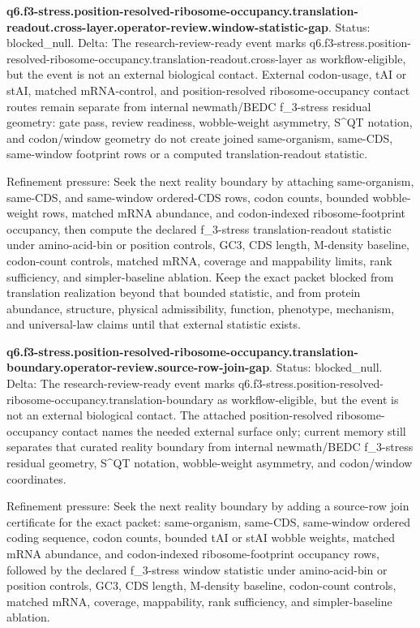 \textbf{q6.f3-stress.position-resolved-ribosome-occupancy.translation-readout.cross-layer.operator-review.window-statistic-gap}. Status: blocked\_null. Delta: The research-review-ready event marks q6.f3-stress.position-resolved-ribosome-occupancy.translation-readout.cross-layer as workflow-eligible, but the event is not an external biological contact. External codon-usage, tAI or stAI, matched mRNA-control, and position-resolved ribosome-occupancy contact routes remain separate from internal newmath/BEDC f\_3-stress residual geometry: gate pass, review readiness, wobble-weight asymmetry, S\textasciicircum{}QT notation, and codon/window geometry do not create joined same-organism, same-CDS, same-window footprint rows or a computed translation-readout statistic.

Refinement pressure: Seek the next reality boundary by attaching same-organism, same-CDS, and same-window ordered-CDS rows, codon counts, bounded wobble-weight rows, matched mRNA abundance, and codon-indexed ribosome-footprint occupancy, then compute the declared f\_3-stress translation-readout statistic under amino-acid-bin or position controls, GC3, CDS length, M-density baseline, codon-count controls, matched mRNA, coverage and mappability limits, rank sufficiency, and simpler-baseline ablation. Keep the exact packet blocked from translation realization beyond that bounded statistic, and from protein abundance, structure, physical admissibility, function, phenotype, mechanism, and universal-law claims until that external statistic exists.

\textbf{q6.f3-stress.position-resolved-ribosome-occupancy.translation-boundary.operator-review.source-row-join-gap}. Status: blocked\_null. Delta: The research-review-ready event marks q6.f3-stress.position-resolved-ribosome-occupancy.translation-boundary as workflow-eligible, but the event is not an external biological contact. The attached position-resolved ribosome-occupancy contact names the needed external surface only; current memory still separates that curated reality boundary from internal newmath/BEDC f\_3-stress residual geometry, S\textasciicircum{}QT notation, wobble-weight asymmetry, and codon/window coordinates.

Refinement pressure: Seek the next reality boundary by adding a source-row join certificate for the exact packet: same-organism, same-CDS, same-window ordered coding sequence, codon counts, bounded tAI or stAI wobble weights, matched mRNA abundance, and codon-indexed ribosome-footprint occupancy rows, followed by the declared f\_3-stress window statistic under amino-acid-bin or position controls, GC3, CDS length, M-density baseline, codon-count controls, matched mRNA, coverage, mappability, rank sufficiency, and simpler-baseline ablation.

